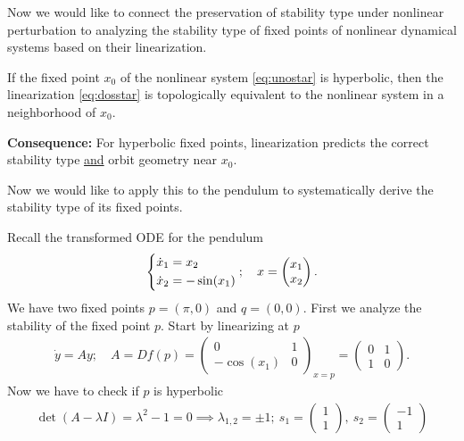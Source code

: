 Now we would like to connect the preservation of stability type under nonlinear perturbation to analyzing the stability type of fixed points of nonlinear dynamical systems based on their linearization. 
\begin{theorem}
	If the fixed point ${x_0} $ of the nonlinear system \eqref{eq:unostar} is hyperbolic, then the linearization \eqref{eq:dosstar} is topologically equivalent to the nonlinear system in a neighborhood of ${x_0} $. 

	\textbf{Consequence:} For hyperbolic fixed points, linearization predicts the correct stability type \underline{and} orbit geometry near ${x_0} $. 
\end{theorem}
Now we would like to apply this to the pendulum to systematically derive the stability type of its fixed points.
\begin{ex}
	Recall the transformed ODE for the pendulum
	\begin{align}
		\begin{dcases}
		\dot{x}_{1} = x_2 \\ \dot{x}_2 = -\sin(x_1)	
		\end{dcases}
		;\quad {x}  = 
		\begin{pmatrix}
			x_1 \\ x_2
		\end{pmatrix}
		.
	\end{align}
	We have two fixed points ${p} =(\pi ,0)$ and ${q} = (0,0)$. First we analyze the stability of the fixed point ${p} $. Start by linearizing at ${p} $ 
	\begin{align}
		\dot{{y} } = {Ay};\quad {A}  = Df({p} ) = 
		\begin{pmatrix}
			0 & 1 \\
			- \cos(x_1) & 0
		\end{pmatrix}_{{x} = {p} } =
		\begin{pmatrix}
			0 & 1 \\ 1 & 0
		\end{pmatrix}.
	\end{align}
	Now we have to check if ${p} $ is hyperbolic
	\begin{align}
		\det({A} - \lambda {I} ) = \lambda^2 -1 = 0 \implies \lambda_{1,2} = \pm 1;\ {s_1} =
		\begin{pmatrix}
			1 \\ 1
		\end{pmatrix}
		,\ {s_2} =
		\begin{pmatrix}
			-1 \\ 1

\end{pmatrix}
\end{align}
\end{ex}
